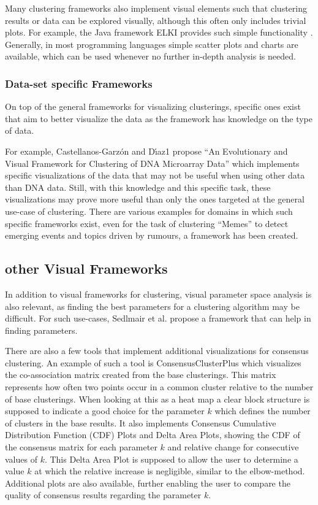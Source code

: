 \documentclass[
	a4paper,
	english,
	twoside,
	openright,               
	11pt                            
	]{report}
\begin{document}
Many clustering frameworks also implement visual elements such that clustering results or data can be explored visually, although this often only includes trivial plots. For example, the Java framework ELKI provides such simple functionality \cite{10.14778/2824032.2824115}. Generally, in most programming languages simple scatter plots and charts are available, which can be used whenever no further in-depth analysis is needed.

\subsubsection{Data-set specific Frameworks}
On top of the general frameworks for visualizing clusterings, specific ones exist that aim to better visualize the data as the framework has knowledge on the type of data. 

For example, Castellanos-Garz\'{o}n and D\'{ı}az1 \cite{DNAVis} propose ``An Evolutionary and Visual Framework for Clustering of DNA Microarray Data'' which implements specific visualizations of the data that may not be useful when using other data than DNA data. Still, with this knowledge and this specific task, these visualizations may prove more useful than only the ones targeted at the general use-case of clustering. There are various examples for domains in which such specific frameworks exist, even for the task of clustering ``Memes'' \cite{Dang2017} to detect emerging events and topics driven by rumours, a framework has been created.

\subsection{other Visual Frameworks}

In addition to visual frameworks for clustering, visual parameter space analysis is also relevant, as finding the best parameters for a clustering algorithm may be difficult. For such use-cases, Sedlmair et al. \cite{6876043} propose a framework that can help in finding parameters.

There are also a few tools that implement additional visualizations for consensus clustering. An example of such a tool is ConsensusClusterPlus \cite{10.1093/bioinformatics/btq170} which visualizes the co-association matrix created from the base clusterings. This matrix represents how often two points occur in a common cluster relative to the number of base clusterings. When looking at this as a heat map a clear block structure is supposed to indicate a good choice for the parameter $k$ which defines the number of clusters in the base results. It also implements Consensus Cumulative Distribution Function (CDF) Plots and Delta Area Plots, showing the CDF of the consensus matrix for each parameter $k$ and relative change for consecutive values of $k$. This Delta Area Plot is supposed to allow the user to determine a value $k$ at which the relative increase is negligible, similar to the elbow-method. Additional plots are also available, further enabling the user to compare the quality of consensus results regarding the parameter $k$.
\end{document}
